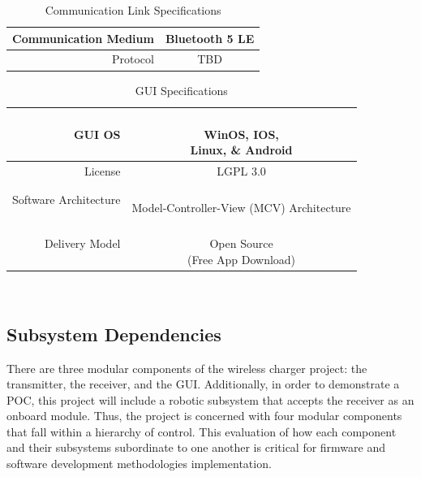 \documentclass[12pt]{article}
\begin{document}
\begin{multicols}{2}
\begin{table}
\centering
\caption{Communication Link Specifications}
\begin{tabular} {| r | c | }
\hline
\parbox{0.45\linewidth}{\raggedleft Communication Medium \\[0.4em]} &  \parbox{0.48\linewidth}{\centering Bluetooth 5 LE}\\
\hline
\parbox{0.45\linewidth}{\raggedleft Protocol} &  \parbox{0.48\linewidth}{\centering TBD}\\
\hline
\end{tabular}
\end{table}


\begin{table}
\centering
\caption{GUI Specifications}
\begin{tabular} {| r | c | }
\hline
\parbox{0.45\linewidth}{\raggedleft GUI OS} & \parbox{0.48\linewidth}{\centering \hfill \\ WinOS, IOS, \\ Linux, \& Android}\\[0.4em]
\hline
\parbox{0.45\linewidth}{\raggedleft License} &    \parbox{0.48\linewidth}{\centering LGPL 3.0} \\
\hline
\parbox{0.45\linewidth}{\raggedleft Software Architecture} &   \parbox{0.48\linewidth}{\centering \hfill \\ Model-Controller-View (MCV) Architecture\\[0.4em]} \\
\hline
\parbox{0.45\linewidth}{\raggedleft Delivery Model} &   \parbox{0.48\linewidth}{\centering \hfill \\ Open Source \\ (Free App Download)} \\[0.4em]
\hline
\end{tabular}
\end{table}
 \hfill \\
 \vfill 

\end{multicols}

\subsection{Subsystem Dependencies}
\indent \indent
There are three modular components of the wireless charger project: the transmitter, the receiver, and the GUI. Additionally, in order to demonstrate a POC, this project will include a robotic subsystem that accepts the receiver as an onboard module.  Thus, the project is concerned with four modular components that fall within a hierarchy of control.  This evaluation of how each component and their subsystems subordinate to one another is critical for firmware and software development methodologies implementation.\\ \indent
\end{document}
